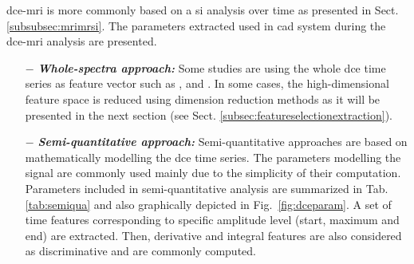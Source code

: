 \ac{dce}-\ac{mri} is more commonly based on a \ac{si} analysis over time as presented in Sect. \ref{subsubsec:mrimrsi}. The parameters extracted used in \ac{cad} system during the \ac{dce}-\ac{mri} analysis are presented.

\begin{enumerate}[leftmargin=*]

\item[$-$] \textbf{\textit{Whole-spectra approach:}} Some studies are using the whole \ac{dce} time series as feature vector such as \cite{Ampeliotis2007,Ampeliotis2008}, \cite{Tiwari2012} and \cite{Viswanath2008a,Viswanath2008}. In some cases, the high-dimensional feature space is reduced using dimension reduction methods as it will be presented in the next section (see Sect. \ref{subsec:featureselectionextraction}).

\item[$-$] \textbf{\textit{Semi-quantitative approach:}} Semi-quantitative approaches are based on mathematically modelling the \ac{dce} time series. The parameters modelling the signal are commonly used mainly due to the simplicity of their computation. Parameters included in semi-quantitative analysis are summarized in Tab. \ref{tab:semiqua} and also graphically depicted in Fig.~\ref{fig:dceparam}. A set of time features corresponding to specific amplitude level (start, maximum and end) are extracted. Then, derivative and integral features are also considered as discriminative and are commonly computed.


\end{enumerate}
